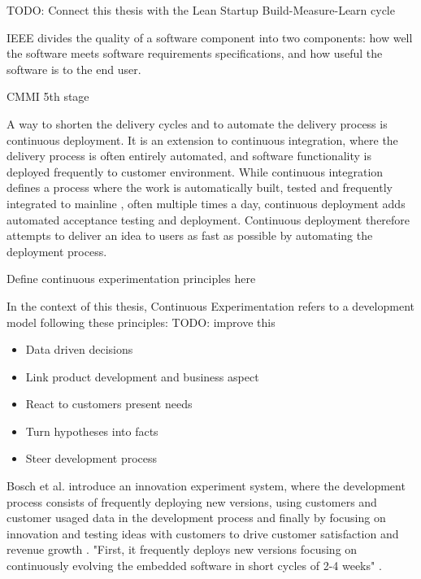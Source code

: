 \documentclass[english]{tktltiki2}
\theoremstyle{definition}
\theoremstyle{remark}
\begin{document}
TODO: Connect this thesis with the Lean Startup Build-Measure-Learn cycle

IEEE divides the quality of a software component into two components: how well the software meets software requirements specifications, and how useful the software is to the end user.

CMMI 5th stage 

A way to shorten the delivery cycles and to automate the delivery process is continuous deployment. It is an extension to continuous integration, where the delivery process is often entirely automated, and software functionality is deployed frequently to customer environment. While continuous integration defines a process where the work is automatically built, tested and frequently integrated to mainline \cite{fowler2006continuous}, often multiple times a day, continuous deployment adds automated acceptance testing and deployment. Continuous deployment therefore attempts to deliver an idea to users as fast as possible by automating the deployment process.

Define continuous experimentation principles here

In the context of this thesis, Continuous Experimentation refers to a development model following these principles: TODO: improve this
\begin{itemize}
\item  Data driven decisions
\item  Link product development and business aspect
\item  React to customers present needs
\item  Turn hypotheses into facts
\item  Steer development process
\end{itemize}


Bosch et al. introduce an innovation experiment system, where the development process consists of frequently deploying new versions, using customers and customer usaged data in the development process and finally by focusing on innovation and testing ideas with customers to drive customer satisfaction and revenue growth \cite{bosch2012building}. "First, it frequently deploys new versions focusing on continuously evolving the embedded software in short cycles of 2-4 weeks" \cite{eklund2012architecture}.
\end{document}

